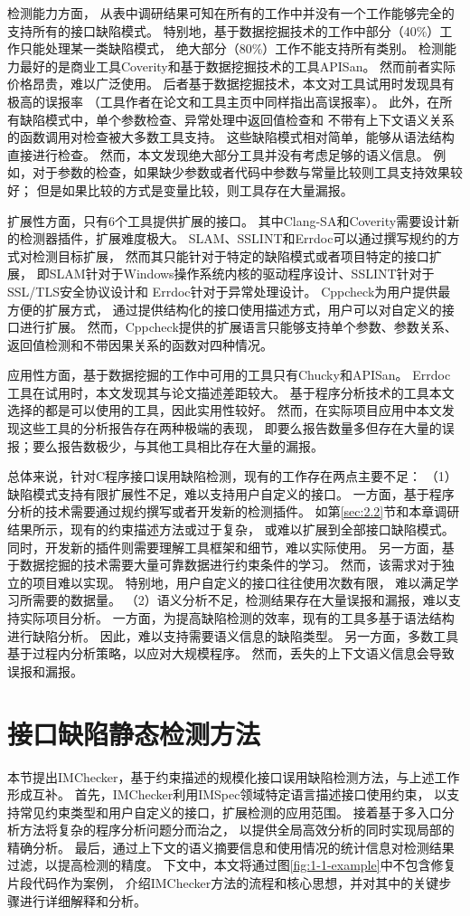 检测能力方面，
从表中调研结果可知在所有的工作中并没有一个工作能够完全的支持所有的接口缺陷模式。
特别地，基于数据挖掘技术的工作中部分（40\%）工作只能处理某一类缺陷模式，
绝大部分（80\%）工作不能支持所有类别。
检测能力最好的是商业工具Coverity和基于数据挖掘技术的工具APISan。
然而前者实际价格昂贵，难以广泛使用。
后者基于数据挖掘技术，本文对工具试用时发现具有极高的误报率
（工具作者在论文和工具主页中同样指出高误报率）。
此外，在所有缺陷模式中，单个参数检查、异常处理中返回值检查和
不带有上下文语义关系的函数调用对检查被大多数工具支持。
这些缺陷模式相对简单，能够从语法结构直接进行检查。
然而，本文发现绝大部分工具并没有考虑足够的语义信息。
例如，对于参数的检查，如果缺少参数或者代码中参数与常量比较则工具支持效果较好；
但是如果比较的方式是变量比较，则工具存在大量漏报。

扩展性方面，只有6个工具提供扩展的接口。
其中Clang-SA和Coverity需要设计新的检测器插件，扩展难度极大。
SLAM、SSLINT和Errdoc可以通过撰写规约的方式对检测目标扩展，
然而其只能针对于特定的缺陷模式或者项目特定的接口扩展，
即SLAM针对于Windows操作系统内核的驱动程序设计、SSLINT针对于SSL/TLS安全协议设计和
Errdoc针对于异常处理设计。
Cppcheck为用户提供最方便的扩展方式，
通过提供结构化的接口使用描述方式，用户可以对自定义的接口进行扩展。
然而，Cppcheck提供的扩展语言只能够支持单个参数、参数关系、返回值检测和不带因果关系的函数对四种情况。

应用性方面，基于数据挖掘的工作中可用的工具只有Chucky和APISan。
Errdoc工具在试用时，本文发现其与论文描述差距较大。
基于程序分析技术的工具本文选择的都是可以使用的工具，因此实用性较好。
然而，在实际项目应用中本文发现这些工具的分析报告存在两种极端的表现，
即要么报告数量多但存在大量的误报；要么报告数极少，与其他工具相比存在大量的漏报。

总体来说，针对C程序接口误用缺陷检测，现有的工作存在两点主要不足：
（1）缺陷模式支持有限扩展性不足，难以支持用户自定义的接口。
一方面，基于程序分析的技术需要通过规约撰写或者开发新的检测插件。
如第\ref{sec:2.2}节和本章调研结果所示，现有的约束描述方法或过于复杂，
或难以扩展到全部接口缺陷模式。
同时，开发新的插件则需要理解工具框架和细节，难以实际使用。
另一方面，基于数据挖掘的技术需要大量可靠数据进行约束条件的学习。
然而，该需求对于独立的项目难以实现。
特别地，用户自定义的接口往往使用次数有限，
难以满足学习所需要的数据量。
（2）语义分析不足，检测结果存在大量误报和漏报，难以支持实际项目分析。
一方面，为提高缺陷检测的效率，现有的工具多基于语法结构进行缺陷分析。
因此，难以支持需要语义信息的缺陷类型。
另一方面，多数工具基于过程内分析策略，以应对大规模程序。
然而，丢失的上下文语义信息会导致误报和漏报。

\section{接口缺陷静态检测方法}
\label{sec:3.3}
本节提出IMChecker，基于约束描述的规模化接口误用缺陷检测方法，与上述工作形成互补。
首先，IMChecker利用IMSpec领域特定语言描述接口使用约束，
以支持常见约束类型和用户自定义的接口，扩展检测的应用范围。
接着基于多入口分析方法将复杂的程序分析问题分而治之，
以提供全局高效分析的同时实现局部的精确分析。
最后，通过上下文的语义摘要信息和使用情况的统计信息对检测结果过滤，以提高检测的精度。
下文中，本文将通过图\ref{fig:1-1-example}中不包含修复片段代码作为案例，
介绍IMChecker方法的流程和核心思想，并对其中的关键步骤进行详细解释和分析。

